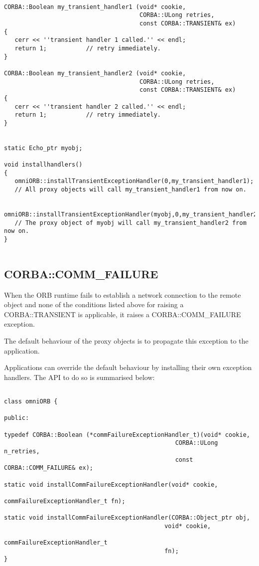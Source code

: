 \documentclass[11pt,twoside,onecolumn]{book}
\begin{document}
{\small
\begin{verbatim}

CORBA::Boolean my_transient_handler1 (void* cookie,
                                      CORBA::ULong retries,
                                      const CORBA::TRANSIENT& ex)
{
   cerr << ''transient handler 1 called.'' << endl;
   return 1;           // retry immediately.
}
 
CORBA::Boolean my_transient_handler2 (void* cookie,
                                      CORBA::ULong retries,
                                      const CORBA::TRANSIENT& ex)
{
   cerr << ''transient handler 2 called.'' << endl;
   return 1;           // retry immediately.
}


static Echo_ptr myobj;

void installhandlers()
{
   omniORB::installTransientExceptionHandler(0,my_transient_handler1);
   // All proxy objects will call my_transient_handler1 from now on.

   omniORB::installTransientExceptionHandler(myobj,0,my_transient_handler2);
   // The proxy object of myobj will call my_transient_handler2 from now on.
}


\end{verbatim}
}


\subsection{CORBA::COMM\_FAILURE}

When the ORB runtime fails to establish a network connection to the remote
object and none of the conditions listed above for raising a
CORBA::TRANSIENT is applicable, it raises a CORBA::COMM\_FAILURE exception.

The default behaviour of the proxy objects is to propagate this exception
to the application.

Applications can override the default behaviour by installing their own
exception handlers. The API to do so is summarised below:

{\small
\begin{verbatim}

class omniORB {

public:

typedef CORBA::Boolean (*commFailureExceptionHandler_t)(void* cookie,
                                                CORBA::ULong n_retries,
                                                const CORBA::COMM_FAILURE& ex);

static void installCommFailureExceptionHandler(void* cookie,
                                             commFailureExceptionHandler_t fn);

static void installCommFailureExceptionHandler(CORBA::Object_ptr obj,
                                             void* cookie,
                                             commFailureExceptionHandler_t
                                             fn);
}
\end{verbatim}
}
\end{document}

